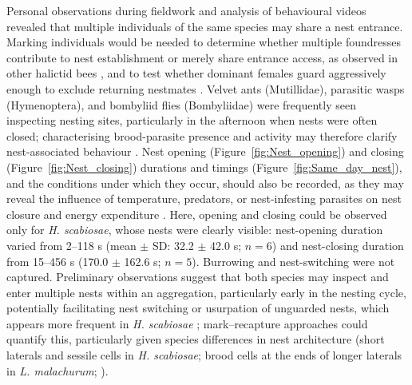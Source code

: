 \documentclass[11pt,a4paper]{article}
\begin{document}
Personal observations during fieldwork and analysis of behavioural videos revealed that multiple individuals of the same species may share a nest entrance. Marking individuals would be needed to determine whether multiple foundresses contribute to nest establishment or merely share entrance access, as observed in other halictid bees \citep{Paxton1999}, and to test whether dominant females guard aggressively enough to exclude returning nestmates \citep{Lienhard2010, Knerer1980, KnererPlateaux1967}. Velvet ants (Mutillidae), parasitic wasps (Hymenoptera), and bombyliid flies (Bombyliidae) \citep{Batra1966, Lienhard2010} were frequently seen inspecting nesting sites, particularly in the afternoon when nests were often closed; characterising brood-parasite presence and activity may therefore clarify nest-associated behaviour \citep{Sick1994, Wcislo1996}. Nest opening (Figure~\ref{fig:Nest_opening}) and closing (Figure~\ref{fig:Nest_closing}) durations and timings (Figure~\ref{fig:Same_day_nest}), and the conditions under which they occur, should also be recorded, as they may reveal the influence of temperature, predators, or nest-infesting parasites on nest closure and energy expenditure \citep{Lienhard2010, Sih2002, Houston1993, Minchella1985, Vandame2002, Wuellner1996}. Here, opening and closing could be observed only for \textit{H. scabiosae}, whose nests were clearly visible: nest-opening duration varied from 2--118 s (mean $\pm$ SD: 32.2 $\pm$ 42.0 s; $n=6$) and nest-closing duration from 15--456 s (170.0 $\pm$ 162.6 s; $n=5$). Burrowing and nest-switching were not captured. Preliminary observations suggest that both species may inspect and enter multiple nests within an aggregation, particularly early in the nesting cycle, potentially facilitating nest switching or usurpation of unguarded nests, which appears more frequent in \textit{H. scabiosae} \citep{Knerer1969}; mark--recapture approaches could quantify this, particularly given species differences in nest architecture (short laterals and sessile cells in \textit{H. scabiosae}; brood cells at the ends of longer laterals in \textit{L. malachurum}; \citep{Knerer1969}).
\end{document}
